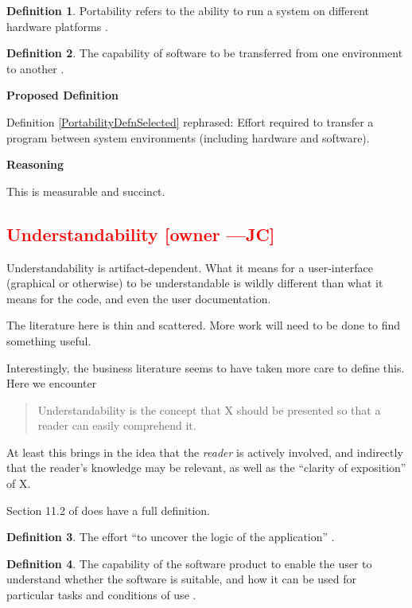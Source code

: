 \documentclass[letterpaper,cleveref]{lipics-v2019}
\newcommand{\authornote}[3]{\textcolor{#1}{[#3 ---#2]}}
\newcommand{\authornote}[3]{}
\newcommand{\jc}[1]{\authornote{red}{JC}{#1}} %
\newcommand{\notdone}[1]{\textcolor{red}{#1}}
\theoremstyle{definition}
\newtheorem{defn}{Definition}
\begin{document}
\begin{defn}
  Portability refers to the ability to run a system on different hardware
  platforms \citep{ghezzi1991fundamentals}.
\end{defn}

\begin{defn}
  The capability of software to be transferred from one environment to another
  \cite{ISO9126}.
\end{defn}
\noindent \textbf{Proposed Definition}

Definition \ref{PortabilityDefnSelected} rephrased: Effort required to transfer
a program between system environments (including hardware and software).

\noindent \textbf{Reasoning}

This is measurable and succinct. 



\subsection{\notdone{Understandability} \jc{owner}}

Understandability is artifact-dependent. What it means for a user-interface
(graphical or otherwise) to be understandable is wildly different than what it
means for the code, and even the user documentation.

The literature here is thin and scattered.  More work will need to be done to
find something useful.

Interestingly, the business literature seems to have taken more care to define
this.  Here we encounter
\begin{quote}
  Understandability is the concept that X should be presented so that a reader
  can easily comprehend it.
\end{quote}
At least this brings in the idea that the \emph{reader} is actively involved,
and indirectly that the reader's knowledge may be relevant, as well as the
``clarity of exposition'' of X.

Section 11.2 of \citet{adams2015nonfunctional} does have a full definition.

\begin{defn}
  The effort ``to uncover the logic of the application''
  \citep{ghezzi1991fundamentals}.
\end{defn}

\begin{defn}
  The capability of the software product to enable the user to understand
  whether the software is suitable, and how it can be used for particular tasks
  and conditions of use \cite{ISO9126}.
\end{defn}
\end{document}
